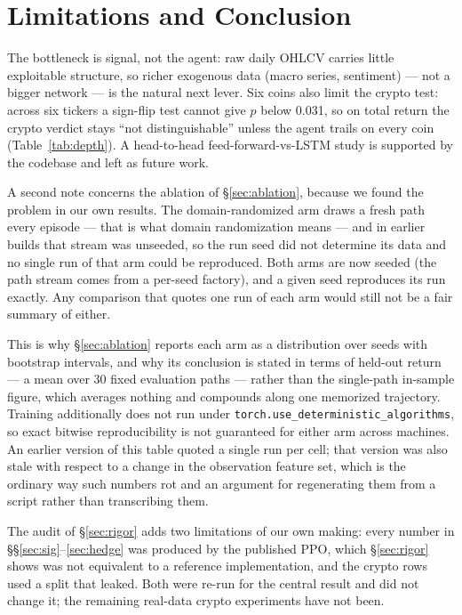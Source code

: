 \documentclass[10pt,twocolumn]{article}
\begin{document}
\section{Limitations and Conclusion}
The bottleneck is signal, not the agent: raw daily OHLCV carries little
exploitable structure, so richer exogenous data (macro series, sentiment) --- not a
bigger network --- is the natural next lever. Six coins also limit the crypto
test: across six tickers a sign-flip test cannot give $p$ below 0.031, so on total
return the crypto verdict stays ``not distinguishable'' unless the agent trails on
every coin (Table~\ref{tab:depth}). A head-to-head feed-forward-vs-LSTM study is
supported by the codebase and left as future work.

A second note concerns the ablation of \S\ref{sec:ablation}, because we found
the problem in our own results. The domain-randomized arm draws a fresh path every
episode --- that is what domain randomization means --- and in earlier builds that
stream was unseeded, so the run seed did not determine its data and no single run
of that arm could be reproduced. Both arms are now seeded (the path stream comes
from a per-seed factory), and a given seed reproduces its run exactly. Any
comparison that quotes one run of each arm would still not be a fair summary of
either.

This is why \S\ref{sec:ablation} reports each arm as a distribution over seeds
with bootstrap intervals, and why its conclusion is stated in terms of held-out
return --- a mean over 30 fixed evaluation paths --- rather than the single-path
in-sample figure, which averages nothing and compounds along one memorized
trajectory. Training additionally does not run under
\texttt{torch.use\_deterministic\_algorithms}, so exact bitwise reproducibility is
not guaranteed for either arm across machines. An earlier version of this table
quoted a single run per cell; that version was also stale with respect to a change
in the observation feature set, which is the ordinary way such numbers rot and an
argument for regenerating them from a script rather than transcribing them.

The audit of \S\ref{sec:rigor} adds two limitations of our own making: every
number in \S\S\ref{sec:sig}--\ref{sec:hedge} was produced by the published PPO,
which \S\ref{sec:rigor} shows was not equivalent to a reference implementation, and
the crypto rows used a split that leaked. Both were re-run for the central result
and did not change it; the remaining real-data crypto experiments have not been.
\end{document}
